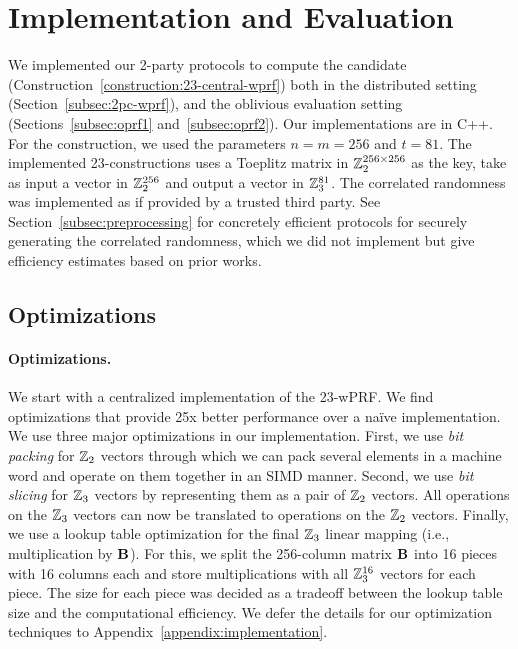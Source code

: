 \section{Implementation and Evaluation}
\label{sec:implementation_and_eval}
We implemented our 2-party protocols to compute the \ttwPRF candidate (Construction~\ref{construction:23-central-wprf}) both in the distributed setting (Section~\ref{subsec:2pc-wprf}), and the oblivious evaluation setting (Sections~\ref{subsec:oprf1} and~\ref{subsec:oprf2}). Our implementations are in C++. For the \ttwPRF construction, we used the parameters $n = m = 256$ and $t = 81$. The implemented 23-constructions uses a Toeplitz matrix in $\mathbb{Z}_2^{256 \times 256}$ as the key, take as input a vector in $\mathbb{Z}_2^{256}$ and output a vector in $\mathbb{Z}_3^{81}$. The correlated randomness was implemented as if provided by a trusted third party.  See Section~\ref{subsec:preprocessing} for concretely efficient protocols for securely generating the correlated randomness, which we did not implement but give efficiency estimates based on prior works. 

\iffull
\subsection{Optimizations}
\label{subsec:implementation_opt}
\else
\paragraph{Optimizations.}
We start with a centralized implementation of the 23-wPRF. We find optimizations that provide 25x better performance over a na\"ive implementation.
\iffull\else 
We use three major optimizations in our implementation. First, we use \textit{bit packing} for $\mathbb{Z}_2$ vectors through which we can pack several elements in a machine word and operate on them together in an SIMD manner. Second, we use \textit{bit slicing} for $\mathbb{Z}_3$ vectors by representing them as a pair of $\mathbb{Z}_2$ vectors. All operations on the $\mathbb{Z}_3$ vectors can now be translated to operations on the $\mathbb{Z}_2$ vectors. Finally, we use a lookup table optimization for the final $\mathbb{Z}_3$ linear mapping (i.e., multiplication by $\mat{B}$). For this, we split the 256-column matrix $\mat{B}$ into 16 pieces with 16 columns each and store multiplications with all $\mathbb{Z}_3^{16}$ vectors for each piece. The size for each piece was decided as a tradeoff between the lookup table size and the computational efficiency. We defer the details for our optimization techniques to Appendix~\ref{appendix:implementation}. \fi


